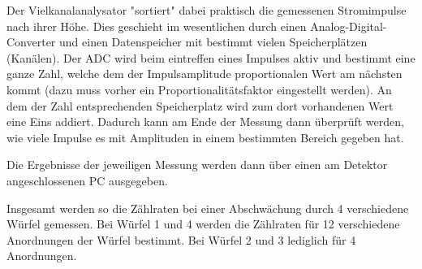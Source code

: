 Der Vielkanalanalysator "sortiert" dabei praktisch die gemessenen Stromimpulse nach ihrer Höhe.
Dies geschieht im wesentlichen durch einen Analog-Digital-Converter und einen Datenspeicher mit bestimmt vielen
Speicherplätzen (Kanälen). Der ADC wird beim eintreffen eines Impulses aktiv und bestimmt eine ganze Zahl, welche
dem der Impulsamplitude proportionalen Wert am nächsten kommt (dazu muss vorher ein Proportionalitätsfaktor eingestellt
werden). An dem der Zahl entsprechenden Speicherplatz wird zum dort vorhandenen Wert eine Eins addiert. Dadurch
kann am Ende der Messung dann überprüft werden, wie viele Impulse es mit Amplituden in einem bestimmten Bereich gegeben hat.

Die Ergebnisse der jeweiligen Messung werden dann über einen am Detektor angeschlossenen PC ausgegeben.

Insgesamt werden so die Zählraten bei einer Abschwächung durch 4 verschiedene Würfel gemessen.
Bei Würfel 1 und 4 werden die Zählraten für 12 verschiedene Anordnungen der Würfel bestimmt.
Bei Würfel 2 und 3 lediglich für 4 Anordnungen.
